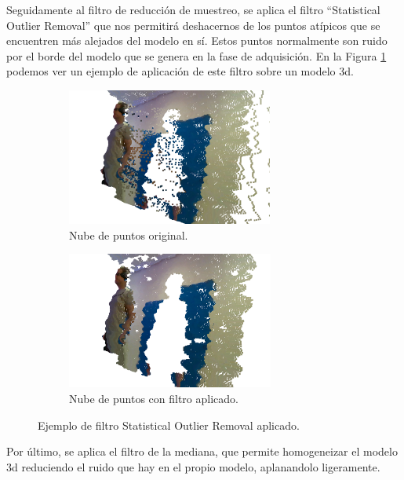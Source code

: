 Seguidamente al filtro de reducción de muestreo, se aplica el filtro ``Statistical Outlier Removal'' que nos permitirá deshacernos de los puntos atípicos que se encuentren más alejados del modelo en sí. Estos puntos normalmente son ruido por el borde del modelo que se genera en la fase de adquisición.
En la Figura \ref{fig:ejemplo-statistical-outlier-removal} podemos ver un ejemplo de aplicación de este filtro sobre un modelo \gls{3d}.

\begin{figure}[h]
    \centering
    \begin{subfigure}[t]{0.33\textheight}
    	\centering
        \includegraphics[height=4.5cm]{archivos/ejemplo-statistical-outlier-removal-original-2.png}
        \caption{Nube de puntos original.}
    \end{subfigure}
    \begin{subfigure}[t]{0.33\textheight}
    	\centering
        \includegraphics[height=4.5cm]{archivos/ejemplo-statistical-outlier-removal-filtro-2.png}
        \caption{Nube de puntos con filtro aplicado.}
    \end{subfigure}
    \caption{Ejemplo de filtro Statistical Outlier Removal aplicado.}
    \label{fig:ejemplo-statistical-outlier-removal}
\end{figure}

Por último, se aplica el filtro de la mediana, que permite homogeneizar el modelo \gls{3d} reduciendo el ruido que hay en el propio modelo, aplanandolo ligeramente.

